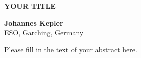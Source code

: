 \documentclass[]{article}
\begin{document}


\bigskip

\begin{center} 

{\Large \bf  YOUR TITLE}

\end{center}

\begin{center}
{\large \bf   
Johannes Kepler                   %
}\\

{\small
ESO, Garching, Germany      %
}\\
\end{center}

Please fill in the text of your abstract here.


\bigskip
\bigskip

\end{document}
